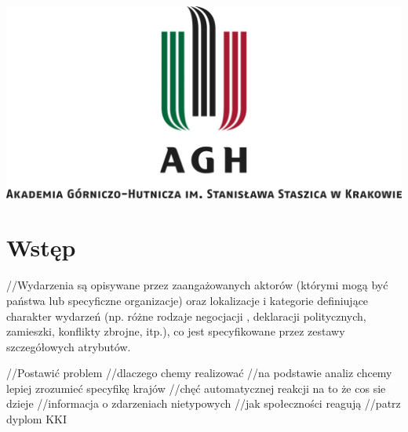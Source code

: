 \documentclass[11pt]{report}
\begin{document}
    \begin{titlepage}
        \centering
        \includegraphics[width=1 \textwidth]{fig/AGH.jpg}
        \vspace{0.03\textheight}
        \bigskip
        \vspace{0.2\textheight}
        \par

        \vspace{0.1\textheight}
    \end{titlepage}

    \tableofcontents


    \chapter{Wstęp}
    //Wydarzenia są opisywane przez zaangażowanych aktorów (którymi mogą być państwa lub specyficzne organizacje) oraz lokalizacje i kategorie definiujące charakter wydarzeń (np. różne rodzaje negocjacji , deklaracji politycznych, zamieszki, konflikty zbrojne, itp.), co jest specyfikowane przez zestawy szczegółowych atrybutów.

    //Postawić problem
    //dlaczego chemy realizować
    //na podstawie analiz chcemy lepiej zrozumieć specyfikę krajów
    //chęć automatycznej reakcji na to że cos sie dzieje
    //informacja o zdarzeniach nietypowych
    //jak społeczności reagują
    //patrz dyplom KKI
\end{document}
